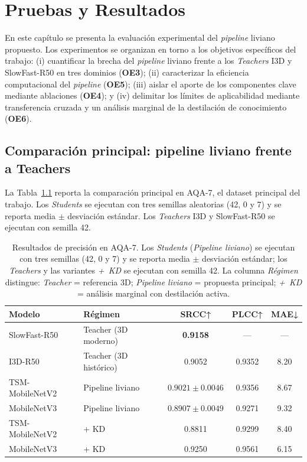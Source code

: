 \chapter{Pruebas y Resultados}
\label{chap:resultados}

En este capítulo se presenta la evaluación experimental del \textit{pipeline} liviano propuesto. Los experimentos se organizan en torno a los objetivos específicos del trabajo: (i) cuantificar la brecha del \textit{pipeline} liviano frente a los \textit{Teachers} \ac{I3D} y SlowFast-R50 en tres dominios (\textbf{OE3}); (ii) caracterizar la eficiencia computacional del \textit{pipeline} (\textbf{OE5}); (iii) aislar el aporte de los componentes clave mediante ablaciones (\textbf{OE4}); y (iv) delimitar los límites de aplicabilidad mediante transferencia cruzada y un análisis marginal de la destilación de conocimiento (\textbf{OE6}).

\section{Comparación principal: pipeline liviano frente a Teachers}
\label{sec:comparacion_principal}

La Tabla~\ref{tab:precision_aqa7} reporta la comparación principal en AQA-7, el dataset principal del trabajo. Los \textit{Students} se ejecutan con tres semillas aleatorias (42, 0 y 7) y se reporta media $\pm$ desviación estándar. Los \textit{Teachers} \ac{I3D} y SlowFast-R50 se ejecutan con semilla 42.

\begin{table}[H]
\centering
\caption{Resultados de precisión en AQA-7. Los \textit{Students} (\textit{Pipeline liviano}) se ejecutan con tres semillas (42, 0 y 7) y se reporta media $\pm$ desviación estándar; los \textit{Teachers} y las variantes \textit{+~KD} se ejecutan con semilla 42. La columna \textit{Régimen} distingue: \textit{Teacher} = referencia 3D; \textit{Pipeline liviano} = propuesta principal; \textit{+~KD} = análisis marginal con destilación activa.}
\label{tab:precision_aqa7}
\small
\begin{tabular}{llccc}
\toprule
\textbf{Modelo} & \textbf{Régimen} & \textbf{SRCC}↑ & \textbf{PLCC}↑ & \textbf{MAE}↓ \\
\midrule
SlowFast-R50      & Teacher (3D moderno)   & \textbf{0.9158}              & ---    & ---  \\
I3D-R50           & Teacher (3D histórico) & 0.9052                       & 0.9352 & 8.20 \\
\midrule
TSM-MobileNetV2   & Pipeline liviano       & $\mathbf{0.9021 \pm 0.0046}$ & 0.9356 & 8.67 \\
MobileNetV3       & Pipeline liviano       & $\mathbf{0.8907 \pm 0.0049}$ & 0.9271 & 9.32 \\
\midrule
TSM-MobileNetV2   & + KD                   & 0.8811                       & 0.9299 & 8.40 \\
MobileNetV3       & + KD                   & 0.9250                       & 0.9561 & 6.15 \\
\bottomrule
\end{tabular}
\end{table}

